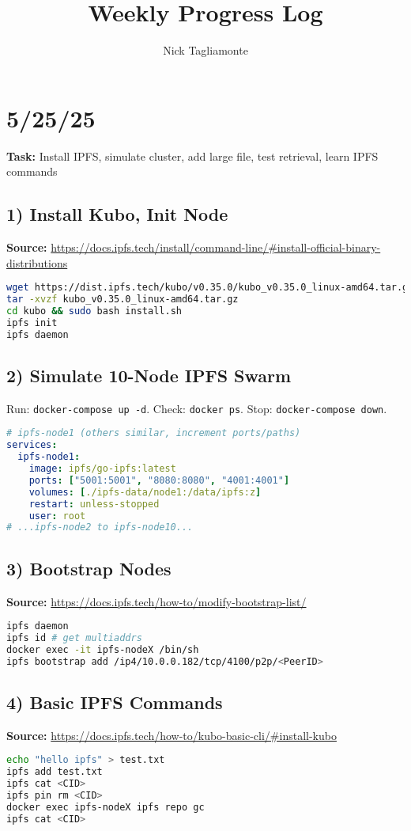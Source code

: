 \documentclass{article}
\title{\vspace{-2cm}Weekly Progress Log}
\author{Nick Tagliamonte}
\date{}
\begin{document}
\maketitle

\section*{5/25/25}

\textbf{Task:} Install IPFS, simulate cluster, add large file, test retrieval, learn IPFS commands

\subsection*{1) Install Kubo, Init Node}
\textbf{Source:} \url{https://docs.ipfs.tech/install/command-line/#install-official-binary-distributions}
\begin{lstlisting}[language=bash]
wget https://dist.ipfs.tech/kubo/v0.35.0/kubo_v0.35.0_linux-amd64.tar.gz
tar -xvzf kubo_v0.35.0_linux-amd64.tar.gz
cd kubo && sudo bash install.sh
ipfs init
ipfs daemon
\end{lstlisting}

\subsection*{2) Simulate 10-Node IPFS Swarm}
Run: \texttt{docker-compose up -d}. Check: \texttt{docker ps}. Stop: \texttt{docker-compose down}.
\begin{lstlisting}[language=yaml]
# ipfs-node1 (others similar, increment ports/paths)
services:
  ipfs-node1:
    image: ipfs/go-ipfs:latest
    ports: ["5001:5001", "8080:8080", "4001:4001"]
    volumes: [./ipfs-data/node1:/data/ipfs:z]
    restart: unless-stopped
    user: root
# ...ipfs-node2 to ipfs-node10...
\end{lstlisting}

\subsection*{3) Bootstrap Nodes}
\textbf{Source:} \url{https://docs.ipfs.tech/how-to/modify-bootstrap-list/}
\begin{lstlisting}[language=bash]
ipfs daemon
ipfs id # get multiaddrs
docker exec -it ipfs-nodeX /bin/sh
ipfs bootstrap add /ip4/10.0.0.182/tcp/4100/p2p/<PeerID>
\end{lstlisting}

\subsection*{4) Basic IPFS Commands}
\textbf{Source:} \url{https://docs.ipfs.tech/how-to/kubo-basic-cli/#install-kubo}
\begin{lstlisting}[language=bash]
echo "hello ipfs" > test.txt
ipfs add test.txt
ipfs cat <CID>
ipfs pin rm <CID>
docker exec ipfs-nodeX ipfs repo gc
ipfs cat <CID>
\end{lstlisting}
\end{document}
